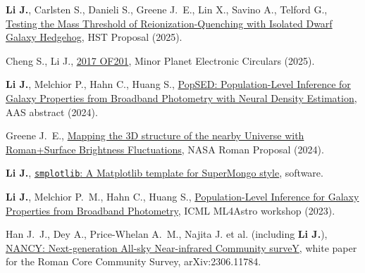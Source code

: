 \item \textbf{Li J.}, Carlsten S., Danieli S., Greene J.~E., Lin X., Savino A., Telford G., \href{https://ui.adsabs.harvard.edu/abs/2025hst..prop18046L}{Testing the Mass Threshold of Reionization-Quenching with Isolated Dwarf Galaxy Hedgehog}, HST Proposal (2025).

\item Cheng S., Li J., \href{https://ui.adsabs.harvard.edu/abs/2025MPEC....K...47C}{2017 OF201}, Minor Planet Electronic Circulars (2025).

\item \textbf{Li J.}, Melchior P., Hahn C., Huang S., \href{https://ui.adsabs.harvard.edu/abs/2024AAS...24326110L}{PopSED: Population-Level Inference for Galaxy Properties from Broadband Photometry with Neural Density Estimation}, AAS abstract (2024).

\item Greene J.~E., \href{https://ui.adsabs.harvard.edu/abs/2024ngr..prop...78G}{Mapping the 3D structure of the nearby Universe with Roman+Surface Brightness Fluctuations}, NASA Roman Proposal (2024).

\item \textbf{Li J.}, \href{https://ui.adsabs.harvard.edu/abs/2023zndo...8126529L}{\texttt{smplotlib}: A Matplotlib template for SuperMongo style}, software.

\item \textbf{Li J.}, Melchior P.~M., Hahn C., Huang S., \href{https://ui.adsabs.harvard.edu/abs/2023mla..confE..20L}{Population-Level Inference for Galaxy Properties from Broadband Photometry}, ICML ML4Astro workshop (2023).

\item Han J.~J., Dey A., Price-Whelan A.~M., Najita J. et al. (including \textbf{Li J.}), \href{https://ui.adsabs.harvard.edu/abs/2023arXiv230611784H}{NANCY: Next-generation All-sky Near-infrared Community surveY}, white paper for the Roman Core Community Survey, arXiv:2306.11784.
